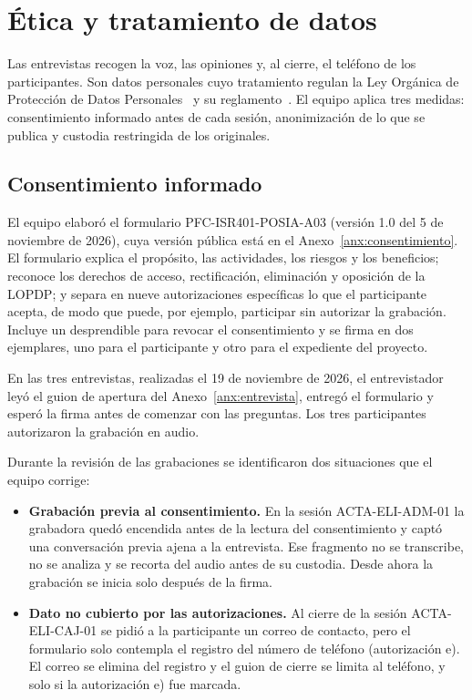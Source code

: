 \section{Ética y tratamiento de datos}\label{sec:etica}

Las entrevistas recogen la voz, las opiniones y, al cierre, el teléfono de los participantes. Son datos personales cuyo tratamiento regulan la Ley Orgánica de Protección de Datos Personales~\cite{lopdp2021} y su reglamento~\cite{reglamentolopdp2023}. El equipo aplica tres medidas: consentimiento informado antes de cada sesión, anonimización de lo que se publica y custodia restringida de los originales.

\subsection{Consentimiento informado}

El equipo elaboró el formulario PFC-ISR401-POSIA-A03 (versión 1.0 del 5 de noviembre de 2026), cuya versión pública está en el Anexo~\ref{anx:consentimiento}. El formulario explica el propósito, las actividades, los riesgos y los beneficios; reconoce los derechos de acceso, rectificación, eliminación y oposición de la LOPDP; y separa en nueve autorizaciones específicas lo que el participante acepta, de modo que puede, por ejemplo, participar sin autorizar la grabación. Incluye un desprendible para revocar el consentimiento y se firma en dos ejemplares, uno para el participante y otro para el expediente del proyecto.

En las tres entrevistas, realizadas el 19 de noviembre de 2026, el entrevistador leyó el guion de apertura del Anexo~\ref{anx:entrevista}, entregó el formulario y esperó la firma antes de comenzar con las preguntas. Los tres participantes autorizaron la grabación en audio.

Durante la revisión de las grabaciones se identificaron dos situaciones que el equipo corrige:

\begin{itemize}
\item \textbf{Grabación previa al consentimiento.} En la sesión ACTA-ELI-ADM-01 la grabadora quedó encendida antes de la lectura del consentimiento y captó una conversación previa ajena a la entrevista. Ese fragmento no se transcribe, no se analiza y se recorta del audio antes de su custodia. Desde ahora la grabación se inicia solo después de la firma.
\item \textbf{Dato no cubierto por las autorizaciones.} Al cierre de la sesión ACTA-ELI-CAJ-01 se pidió a la participante un correo de contacto, pero el formulario solo contempla el registro del número de teléfono (autorización e). El correo se elimina del registro y el guion de cierre se limita al teléfono, y solo si la autorización e) fue marcada.
\end{itemize}

